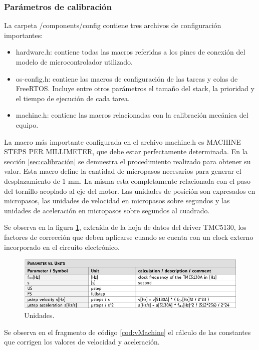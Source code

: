 \subsubsection{Parámetros de calibración}
\label{subsec:calibracion}

La carpeta /components/config contiene tres archivos de configuración importantes:
\begin{itemize}
\item hardware.h: contiene todas las macros referidas a los pines de conexión del modelo de microcontrolador utilizado.
\item os-config.h: contiene las macros de configuración de las tareas y colas de FreeRTOS. Incluye entre otros parámetros el tamaño del stack, la prioridad y el tiempo de ejecución de cada tarea.
\item machine.h: contiene las macros relacionadas con la calibración mecánica del equipo.
\end{itemize}


La macro más importante configurada en el archivo machine.h es MACHINE STEPS PER MILLIMETER, que debe estar perfectamente determinada. En la sección \ref{sec:calibración} se demuestra el procedimiento realizado para obtener su valor. Esta macro define la cantidad de micropasos necesarios para generar el desplazamiento de 1 mm. La misma esta completamente relacionada con el paso del tornillo acoplado al eje del motor. Las unidades de posición son expresados en micropasos, las unidades de velocidad en micropasos sobre segundos y las unidades de aceleración en micropasos sobre segundos al cuadrado. 

Se observa en la figura \ref{fig:unidades}, extraída de la hoja de datos del driver TMC5130, los factores de corrección que deben aplicarse cuando se cuenta con un clock externo incorporado en el circuito electrónico. 

\begin{figure}[h!]
	\centering
	\includegraphics[width=1\textwidth]{./Figures/unit.png}
	\caption{Unidades.}
	\label{fig:unidades}
\end{figure}

Se observa en el fragmento de código \ref{cod:vMachine} el cálculo de las constantes que corrigen los valores de velocidad y aceleración.

